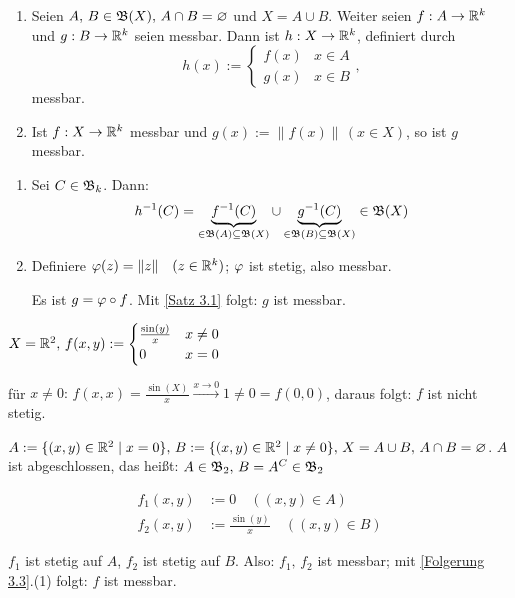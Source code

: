 \documentclass[a4paper,twoside,DIV15,BCOR12mm,chapterprefix=true,headings=onelinechapter]{scrbook}
\begin{document}
\begin{folgerungen}
\label{Folgerung 3.3}
\begin{enumerate}
\item Seien \(A,\,B\in\mathfrak{B}(X),\,A\cap B=\varnothing\) und \(X=A\cup B\). Weiter seien \(f:A\to\mathbb{R}^{k}\) und
\(g:B\to\mathbb{R}^{k}\) seien messbar. Dann ist \(h:X\to\mathbb{R}^{k}\), definiert durch 
\[
h(x):=\begin{cases}f(x)&x\in A\\g(x)&x\in B\end{cases},
\]
messbar.
\item Ist \(f:X\to\mathbb{R}^{k}\) messbar und \(g(x):=\lVert f(x)\rVert\,(x\in X)\), so ist \(g\) messbar.
\end{enumerate}
\end{folgerungen}

\begin{beweis}
\begin{enumerate}
\item Sei \(C\in\mathfrak{B}_{k}\). Dann:
\[
h^{-1}(C)=\underbrace{f^{-1}(C)}_{\in\mathfrak{B}(A)\subseteq\mathfrak{B}(X)}\cup\underbrace{g^{-1}(C)}_{\in\mathfrak{B}(B)\subseteq\mathfrak{B}(X)}\in\mathfrak{B}(X)
\]
\item Definiere \(\varphi(z)=\lVert z\rVert\quad(z\in\mathbb{R}^{k})\); \(\varphi\) ist
stetig, also messbar.

Es ist \(g=\varphi\circ f\). Mit \ref{Satz 3.1} folgt: \(g\) ist messbar.
\end{enumerate}
\end{beweis}

\begin{beispiel}
\(X=\mathbb{R}^{2},\,f(x,y):=\begin{cases}\frac{\sin(y)}{x}&x\neq 0\\0&x=0\end{cases}\)

f\"ur \(x\neq 0:\,f(x,x)=\frac{\sin(X)}{x}\overset{x\to 0}{\to}1\neq 0=f(0,0)\), daraus folgt: \(f\) ist nicht stetig.

\(A:=\{(x,y)\in\mathbb{R}^{2}\mid x=0\},\,B:=\{(x,y)\in\mathbb{R}^{2}\mid x\neq 0\},\,X=A\cup B,\,A\cap B=\varnothing\). \(A\) ist
abgeschlossen, das hei\ss t: \(A\in\mathfrak{B}_{2},\,B=A^{C}\in\mathfrak{B}_{2}\)

\begin{align*}
f_{1}(x,y)&:=0\quad((x,y)\in A)\\
f_{2}(x,y)&:=\frac{\sin(y)}{x}\quad((x,y)\in B)
\end{align*}

\(f_{1}\) ist stetig auf \(A\), \(f_{2}\) ist stetig auf \(B\). Also: \(f_{1},\,f_{2}\) ist messbar; mit \ref{Folgerung 3.3}.(1) folgt: \(f\) ist messbar.
\end{beispiel}
\end{document}
